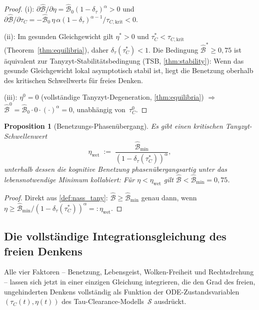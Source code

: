 ﻿\documentclass[12pt,a4paper]{article}
\newtheorem{proposition}[theorem]{Proposition}
\theoremstyle{definition}
\begin{document}
	\begin{proof}
		(i): $\partial\hat{\mathcal{B}}/\partial\eta = \hat{\mathcal{B}}_0(1-\delta_\tau)^\alpha > 0$
		und $\partial\hat{\mathcal{B}}/\partial\tau_C =
		-\hat{\mathcal{B}}_0\,\eta\,\alpha(1-\delta_\tau)^{\alpha-1}/\tau_{C,\mathrm{krit}} < 0$.

		(ii): Im gesunden Gleichgewicht gilt $\eta^* > 0$ und $\tau_C^* < \tau_{C,\mathrm{krit}}$
		(Theorem~\ref{thm:equilibria}), daher $\delta_\tau(\tau_C^*) < 1$.
		Die Bedingung $\hat{\mathcal{B}}^* \geq 0{,}75$ ist äquivalent zur Tanyzyt-Stabilitätsbedingung
		(TSB, \cref{thm:stability}): Wenn das gesunde Gleichgewicht lokal asymptotisch stabil ist,
		liegt die Benetzung oberhalb des kritischen Schwellwerts für freies Denken.

		(iii): $\eta^0 = 0$ (vollständige Tanyzyt-Degeneration, \cref{thm:equilibria})
		$\Rightarrow$ $\hat{\mathcal{B}}^0 = \hat{\mathcal{B}}_0 \cdot 0 \cdot (\cdot)^\alpha = 0$,
		unabhängig von~$\tau_C^0$.
	\end{proof}

	\begin{proposition}[Benetzungs-Phasenübergang]
		\label{prop:benet_phase}
		Es gibt einen kritischen Tanyzyt-Schwellenwert
		\[
			\eta_{\mathrm{wet}}
			\;:=\; \frac{\hat{\mathcal{B}}_{\min}}{(1 - \delta_\tau(\tau_C^*))^\alpha},
		\]
		unterhalb dessen die kognitive Benetzung phasenübergangsartig unter das lebensnotwendige
		Minimum kollabiert: Für $\eta < \eta_{\mathrm{wet}}$ gilt
		$\hat{\mathcal{B}} < \hat{\mathcal{B}}_{\min} = 0{,}75$.
	\end{proposition}

	\begin{proof}
		Direkt aus \cref{def:nass_tany}: $\hat{\mathcal{B}} \geq \hat{\mathcal{B}}_{\min}$
		genau dann, wenn
		$\eta \geq \hat{\mathcal{B}}_{\min}/(1-\delta_\tau(\tau_C^*))^\alpha =: \eta_{\mathrm{wet}}$.
	\end{proof}

	\subsection{Die vollständige Integrationsgleichung des freien Denkens}

	Alle vier Faktoren -- Benetzung, Lebensgeist, Wolken-Freiheit und Rechtsdrehung --
	lassen sich jetzt in einer einzigen Gleichung integrieren, die den Grad des freien,
	ungehinderten Denkens vollständig als Funktion der ODE-Zustandsvariablen
	$(\tau_C(t), \eta(t))$ des Tau-Clearance-Modells~$\mathcal{S}$ ausdrückt.
\end{document}
